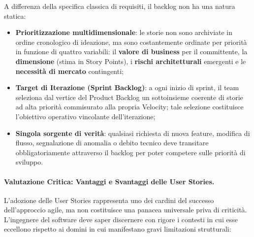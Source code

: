 \documentclass[12pt]{extarticle}
\begin{document}
\noindent A differenza della specifica classica di requisiti, il backlog non ha una natura statica:
\begin{itemize}
    \item \textbf{Prioritizzazione multidimensionale}: le storie non sono archiviate in ordine cronologico di ideazione, ma sono costantemente ordinate per priorità in funzione di quattro variabili: il \textbf{valore di business} per il committente, la \textbf{dimensione} (stima in Story Points), i \textbf{rischi architetturali} emergenti e le \textbf{necessità di mercato} contingenti;
    \item \textbf{Target di Iterazione (Sprint Backlog)}: a ogni inizio di sprint, il team seleziona dal vertice del Product Backlog un sottoinsieme coerente di storie ad alta priorità commisurato alla propria Velocity; tale selezione costituisce l'obiettivo operativo vincolante dell'iterazione;
    \item \textbf{Singola sorgente di verità}: qualsiasi richiesta di nuova feature, modifica di flusso, segnalazione di anomalia o debito tecnico deve transitare obbligatoriamente attraverso il backlog per poter competere sulle priorità di sviluppo.
\end{itemize}

\paragraph{Valutazione Critica: Vantaggi e Svantaggi delle User Stories.}
L'adozione delle User Stories rappresenta uno dei cardini del successo dell'approccio agile, ma non costituisce una panacea universale priva di criticità. L'ingegnere del software deve saper discernere con rigore i contesti in cui esse eccellono rispetto ai domini in cui manifestano gravi limitazioni strutturali:
\end{document}
